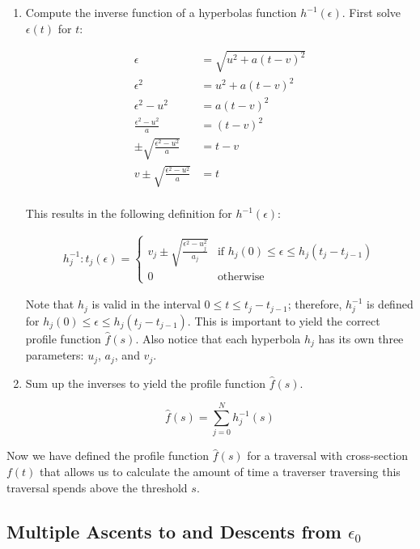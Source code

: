 \begin{enumerate}
	\item Compute the inverse function of a hyperbolas function $h^{-1}(\epsilon)$. First solve $\epsilon(t)$ for $t$:
	
	\begin{align*}
		\epsilon & = \sqrt{u^2 + a(t - v)^2}\\
		\epsilon^2 & = u^2 + a(t - v)^2\\
		\epsilon^2 - u^2 & = a(t - v)^2\\
		\frac{\epsilon^2 - u^2}{a} & = (t - v)^2\\
		\pm\sqrt{\frac{\epsilon^2 - u^2}{a}} & = t - v\\
		v \pm \sqrt{\frac{\epsilon^2 - u^2}{a}} & = t\\
	\end{align*}
	
	This results in the following definition for $h^{-1}(\epsilon)$:
	
	\begin{align}
		h_j^{-1}: t_j(\epsilon) = 
		\begin{cases}
   			{v_j \pm \sqrt{\frac{\epsilon^2 - u_j^2}{a_j}}}	& \text{if } {h_j(0) \leq \epsilon \leq h_j(t_j - t_{j-1})}\\
   			0        										& \text{otherwise}
  		\end{cases} \label{eq:hinv}
  	\end{align}
	
	Note that $h_j$ is valid in the interval $0 \leq t \leq t_j - t_{j-1}$; therefore, $h_j^{-1}$ is defined for $h_j(0) \leq \epsilon \leq h_j(t_j - t_{j-1})$. This is important to yield the correct profile function $\hat{f}(s)$. Also notice that each hyperbola $h_j$ has its own three parameters: $u_j$, $a_j$, and $v_j$.
	
	\item Sum up the inverses to yield the profile function $\hat{f}(s)$.
	
	$$\hat{f}(s) = \sum_{j=0}^N {h_j^{-1}(s)}$$
	
\end{enumerate} 

Now we have defined the profile function $\hat{f}(s)$ for a traversal with cross-section $f(t)$ that allows us to calculate the amount of time a traverser traversing this traversal spends above the threshold $s$.

\subsection{Multiple Ascents to and Descents from $\epsilon_0$}

